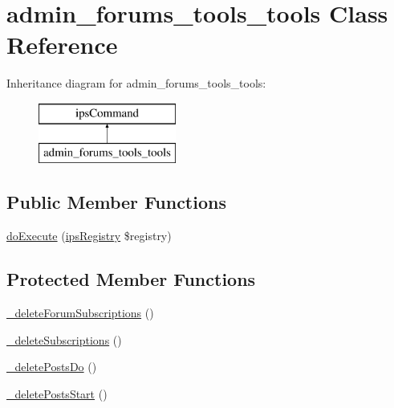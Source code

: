 \hypertarget{classadmin__forums__tools__tools}{\section{admin\-\_\-forums\-\_\-tools\-\_\-tools Class Reference}
\label{classadmin__forums__tools__tools}
}
Inheritance diagram for admin\-\_\-forums\-\_\-tools\-\_\-tools\-:\begin{figure}[H]
\begin{center}
\leavevmode
\includegraphics[height=2.000000cm]{classadmin__forums__tools__tools}
\end{center}
\end{figure}
\subsection*{Public Member Functions}
\begin{DoxyCompactItemize}
\item 
\hyperlink{classadmin__forums__tools__tools_afbc4e912a0604b94d47d66744c64d8ba}{do\-Execute} (\hyperlink{classips_registry}{ips\-Registry} \$registry)
\end{DoxyCompactItemize}
\subsection*{Protected Member Functions}
\begin{DoxyCompactItemize}
\item 
\hyperlink{classadmin__forums__tools__tools_a55ee0ed033d22e7a71c8483816afc79c}{\-\_\-delete\-Forum\-Subscriptions} ()
\item 
\hyperlink{classadmin__forums__tools__tools_aa60a8a2b657ae2a6f43ca380b09a3458}{\-\_\-delete\-Subscriptions} ()
\item 
\hyperlink{classadmin__forums__tools__tools_aaf5aeae33f2879db18f406e9413579a8}{\-\_\-delete\-Posts\-Do} ()
\item 
\hyperlink{classadmin__forums__tools__tools_a83bcfae693172e6eeb967e28955923c8}{\-\_\-delete\-Posts\-Start} ()
\end{DoxyCompactItemize}
